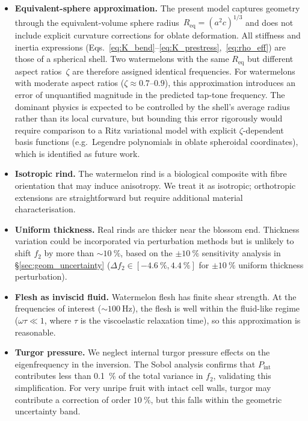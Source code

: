 \begin{itemize}
  \item \textbf{Equivalent-sphere approximation.}  The present model
    captures geometry through the equivalent-volume sphere
    radius~$R_{\mathrm{eq}} = (a^2 c)^{1/3}$ and does not include
    explicit curvature corrections for oblate deformation.  All
    stiffness and inertia expressions
    (Eqs.~\ref{eq:K_bend}--\ref{eq:K_prestress},~\ref{eq:rho_eff})
    are those of a spherical shell.  Two watermelons with the same
    $R_{\mathrm{eq}}$ but different aspect ratios~$\zeta$ are therefore
    assigned identical frequencies.  For watermelons with moderate
    aspect ratios ($\zeta \approx 0.7$--$0.9$), this approximation
    introduces an error of unquantified magnitude in the predicted
    tap-tone frequency.  The dominant physics is expected to be
    controlled by the shell's average radius rather than its local
    curvature, but bounding this error rigorously would require
    comparison to a Ritz variational model
    with explicit $\zeta$-dependent basis functions (e.g.\ Legendre
    polynomials in oblate spheroidal coordinates), which is identified
    as future work.

  \item \textbf{Isotropic rind.}  The watermelon rind is a biological
    composite with fibre orientation that may induce anisotropy.  We
    treat it as isotropic; orthotropic extensions are straightforward
    but require additional material characterisation.

  \item \textbf{Uniform thickness.}  Real rinds are thicker near the
    blossom end.  Thickness variation could be incorporated via
    perturbation methods but is unlikely to shift $f_2$ by more than
    $\sim\SI{10}{\percent}$, based on the $\pm\SI{10}{\percent}$
    sensitivity analysis in \S\ref{sec:geom_uncertainty}
    ($\Delta f_2 \in [\SI{-4.6}{\percent}, \SI{+4.4}{\percent}]$ for
    $\pm\SI{10}{\percent}$ uniform thickness perturbation).

  \item \textbf{Flesh as inviscid fluid.}  Watermelon flesh has finite
    shear strength.  At the frequencies of interest
    ($\sim\SI{100}{\hertz}$), the flesh is well within the
    fluid-like regime ($\omega \tau \ll 1$, where $\tau$ is the
    viscoelastic relaxation time), so this approximation is reasonable.

  \item \textbf{Turgor pressure.}  We neglect internal turgor pressure
    effects on the eigenfrequency in the inversion.  The Sobol analysis
    confirms that $P_{\mathrm{int}}$ contributes less than
    \SI{0.1}{\percent} of the total variance in $f_2$, validating this
    simplification.  For very unripe fruit with intact cell walls,
    turgor may contribute a correction of order $\SI{10}{\percent}$,
    but this falls within the geometric uncertainty band.


\end{itemize}
